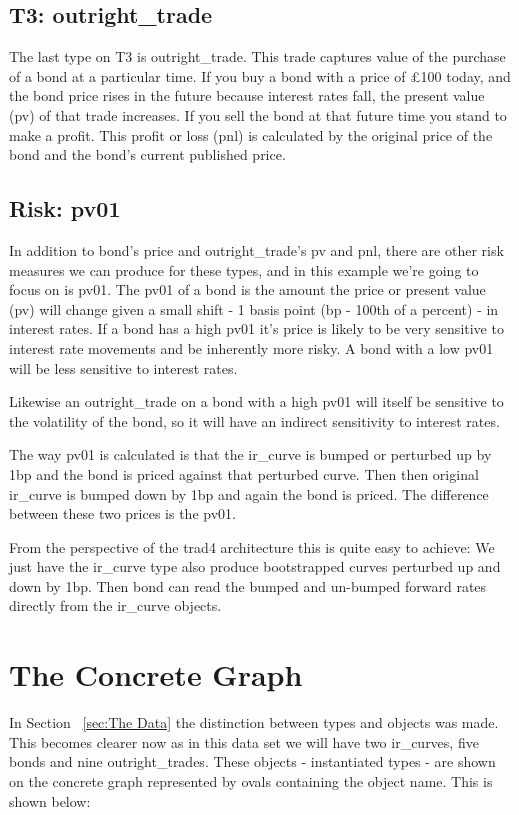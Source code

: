 \documentclass{report}
\begin{document}
\subsection{T3: outright_trade}

The last type on T3 is outright_trade. This trade captures value of the purchase of a bond at a particular time. If you buy a bond with a price of £100 today, and the bond price rises in the future because interest rates fall, the present value (pv) of that trade increases. If you sell the bond at that future time you stand to make a profit. This profit or loss (pnl) is calculated by the original price of the bond and the bond's current published price.

\subsection{Risk: pv01}

In addition to bond's price and outright_trade's pv and pnl, there are other risk measures we can produce for these types, and in this example we're going to focus on is pv01. The pv01 of a bond is the amount the price or present value (pv) will change given a small shift - 1 basis point (bp - 100th of a percent) - in interest rates. If a bond has a high pv01 it's price is likely to be very sensitive to interest rate movements and be inherently more risky. A bond with a low pv01 will be less sensitive to interest rates. 

Likewise an outright_trade on a bond with a high pv01 will itself be sensitive to the volatility of the bond, so it will have an indirect sensitivity to interest rates.

The way pv01 is calculated is that the ir_curve is bumped or perturbed up by 1bp and the bond is priced against that perturbed curve. Then then original ir_curve is bumped down by 1bp and again the bond is priced. The difference between these two prices is the pv01.

From the perspective of the trad4 architecture this is quite easy to achieve: We just have the ir_curve type also produce bootstrapped curves perturbed up and down by 1bp. Then bond can read the bumped and un-bumped forward rates directly from the ir_curve objects. 

\section{The Concrete Graph}

In Section ~\ref{sec:The Data} the distinction between types and objects was made. This becomes clearer now as in this data set we will have two ir_curves, five bonds and nine outright_trades. These objects - instantiated types - are shown on the concrete graph represented by ovals containing the object name. This is shown below:
\end{document}
